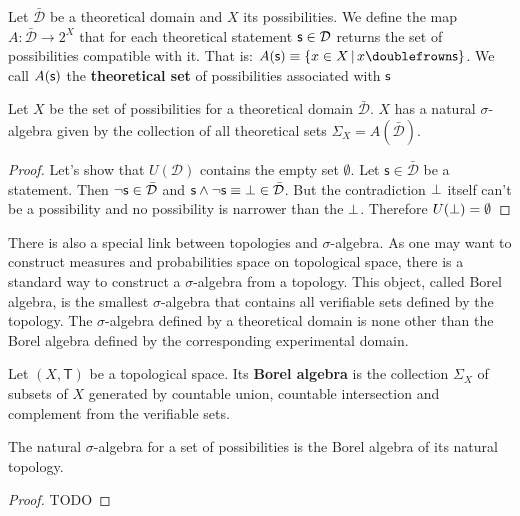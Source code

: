 \documentclass[11pt,letterpaper,fleqn]{memoir} %
\begin{document}
\begin{mathSection}
	
	\begin{defn}
		Let $\bar{\mathcal{D}}$ be a theoretical domain and $X$ its possibilities. We define the map $A : \bar{\mathcal{D}} \rightarrow 2^X$ that for each theoretical statement $\mathsf{s} \in \mathcal{D}$ returns the set of possibilities compatible with it. That is: $A(\stmt{s})\equiv\{ x \in X \, | \, x \comp \stmt{s}\}$. We call $A(\mathsf{s})$ the \textbf{theoretical set} of possibilities associated with $\mathsf{s}$
	\end{defn}
	
	\begin{prop}
		Let $X$ be the set of possibilities for a theoretical domain $\bar{\mathcal{D}}$. $X$ has a natural $\sigma$-algebra given by the collection of all theoretical sets $\Sigma_X=A(\bar{\mathcal{D}})$.
	\end{prop}
	
	\begin{proof}
		Let's show that $U(\mathcal{D})$ contains the empty set $\emptyset$. Let $\mathsf{s} \in \bar{\mathcal{D}}$ be a statement. Then $\neg\mathsf{s} \in \bar{\mathcal{D}}$ and $\mathsf{s} \wedge \neg\mathsf{s} \equiv \bot \in \bar{\mathcal{D}}$. But the contradiction $\bot$ itself can't be a possibility and no possibility is narrower than the $\bot$. Therefore $U(\bot) = \emptyset$
	\end{proof}
\end{mathSection}

There is also a special link between topologies and $\sigma$-algebra. As one may want to construct measures and probabilities space on topological space, there is a standard way to construct a $\sigma$-algebra from a topology. This object, called Borel algebra, is the smallest $\sigma$-algebra that contains all verifiable sets defined by the topology. The $\sigma$-algebra defined by a theoretical domain is none other than the Borel algebra defined by the corresponding experimental domain.

\begin{mathSection}
	
	\begin{defn}
		Let $(X, \mathsf{T})$ be a topological space. Its \textbf{Borel algebra} is the collection $\Sigma_X$ of subsets of $X$ generated by countable union, countable intersection and complement from the verifiable sets.
	\end{defn}
	
	\begin{prop}
		The natural $\sigma$-algebra for a set of possibilities is the Borel algebra of its natural topology.
	\end{prop}
	
	\begin{proof}
TODO
	\end{proof}
\end{mathSection}
\end{document}
